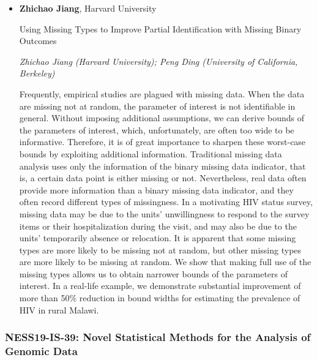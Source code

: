 \begin{itemize}
\item \textbf{Zhichao Jiang}, Harvard University

Using Missing Types to Improve Partial Identification with Missing Binary Outcomes

\emph{\footnotesize Zhichao Jiang (Harvard University); Peng Ding (University of California, Berkeley)}

Frequently, empirical studies are plagued with missing data. When the data are missing not at random, the parameter of interest is not identifiable in general. Without imposing additional assumptions, we can derive bounds of the parameters of interest, which, unfortunately, are often too wide to be informative. Therefore, it is of great importance to sharpen these worst-case bounds by exploiting additional information.  Traditional missing data analysis uses only the information of the binary missing data indicator, that is, a certain data point is either missing or not. Nevertheless, real data often provide more information than a binary missing data indicator, and they often record different types of missingness. In a motivating HIV status survey, missing data may be due to the units' unwillingness to respond to the survey items or their hospitalization during the visit, and may also be due to the units' temporarily absence or relocation. It is apparent that some missing types are more likely to be missing not at random, but  other missing types are more likely to be missing at random. We show that making full use of the missing types allows us to obtain narrower bounds of the parameters of interest. In a real-life example, we demonstrate substantial improvement of more than 50\% reduction in bound widths for estimating the prevalence of HIV in rural Malawi.

\end{itemize}

\subsubsection*{NESS19-IS-39: Novel Statistical Methods for the Analysis of Genomic Data}

